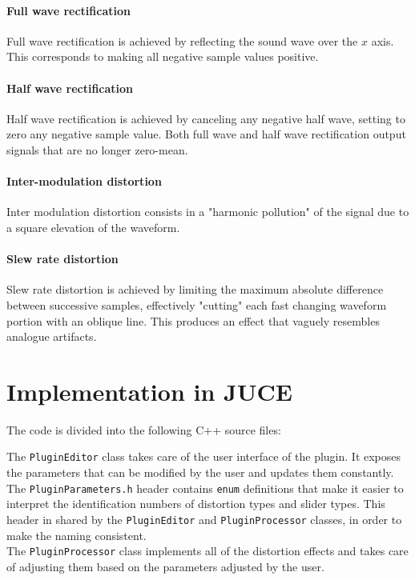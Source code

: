 \documentclass{article}
\newcommand{\code}{\texttt}
\begin{document}
\paragraph{Full wave rectification} 
Full wave rectification is achieved by reflecting the sound wave over the $x$ axis. This corresponds to making all negative sample values positive.
\paragraph{Half wave rectification} 
Half wave rectification is achieved by canceling any negative half wave, setting to zero any negative sample value. Both full wave and half wave rectification output signals that are no longer zero-mean.
\paragraph{Inter-modulation distortion} 
Inter modulation distortion consists in a "harmonic pollution" of the signal due to a square elevation of the waveform. 
\paragraph{Slew rate distortion}
Slew rate distortion is achieved by limiting the maximum absolute difference between successive samples, effectively "cutting" each fast changing waveform portion with an oblique line. This produces an effect that vaguely resembles analogue artifacts.

\section{Implementation in JUCE}
The code is divided into the following C++ source files:
\bigskip

{} %

\bigskip
\noindent The \code{PluginEditor} class takes care of the user interface of the plugin. It exposes the parameters that can be modified by the user and updates them constantly.\\
The \code{PluginParameters.h} header contains \code{enum} definitions that make it easier to interpret the identification numbers of distortion types and slider types. This header in shared by the \code{PluginEditor} and \code{PluginProcessor} classes, in order to make the naming consistent.\\
The \code{PluginProcessor} class implements all of the distortion effects and takes care of adjusting them based on the parameters adjusted by the user.
\end{document}
